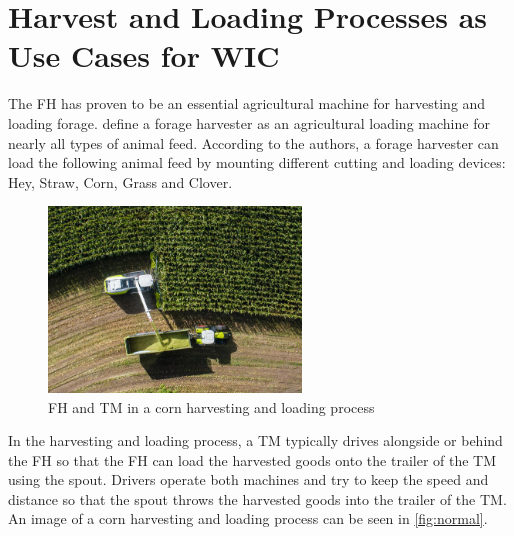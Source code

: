 \section[Use Cases for \acl{WIC}]{Harvest and Loading Processes as Use Cases for \acl{WIC}}
\label{sec:corn_harvest_scenario}
The \ac{FH} has proven to be an essential agricultural machine for harvesting and loading forage. \textcite{seifert_feldhacksler_1962} define a forage harvester as an agricultural loading machine for nearly all types of animal feed. According to the authors, a forage harvester can load the following animal feed by mounting different cutting and loading devices: Hey, Straw, Corn, Grass and Clover.
\begin{figure}%
   \centering
   \includegraphics[width=0.6\textwidth]{figures/claas_harvest_side.png}
   \caption{\acf{FH} and \acf{TM} in a corn harvesting and loading process}%
   \label{fig:normal}%
\end{figure}

In the harvesting and loading process, a \ac{TM} typically drives alongside or behind the \ac{FH} so that the \ac{FH} can load the harvested goods onto the trailer of the \ac{TM} using the spout. Drivers operate both machines and try to keep the speed and distance so that the spout throws the harvested goods into the trailer of the TM. An image of a corn harvesting and loading process can be seen in \autoref{fig:normal}.

